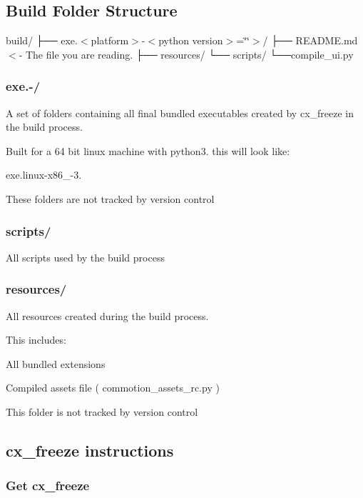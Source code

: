 \subsection*{Build Folder Structure}

build/ ├── exe.$<$platform$>$-\/$<$python version$>$=\char`\"{}\char`\"{}$>$/ ├── R\+E\+A\+D\+M\+E.\+md $<$-\/ The file you are reading. ├── resources/ └── scripts/ └──compile\+\_\+ui.\+py

\subsubsection*{exe.-\//}

A set of folders containing all final bundled executables created by cx\+\_\+freeze in the build process.

Built for a 64 bit linux machine with python3. this will look like\+:

{\ttfamily exe.\+linux-\/x86\+\_-\/3.}

These folders are not tracked by version control

\subsubsection*{scripts/}

All scripts used by the build process

\subsubsection*{resources/}

All resources created during the build process.

This includes\+:
\begin{DoxyItemize}
\item All bundled extensions
\item Compiled assets file ( commotion\+\_\+assets\+\_\+rc.\+py )
\end{DoxyItemize}

This folder is not tracked by version control

\subsection*{cx\+\_\+freeze instructions}

\subsubsection*{Get cx\+\_\+freeze}


